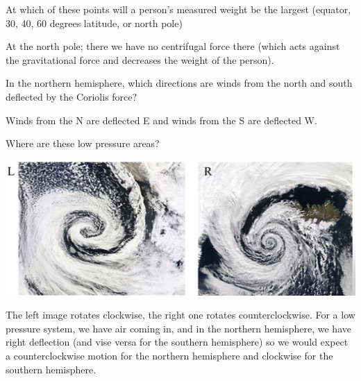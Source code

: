 At which of these points will a person's measured weight be the largest (equator, 30, 40, 60 degrees latitude, or north pole)
\begin{s}
At the north pole; there we have no centrifugal force there (which acts against the gravitational force and decreases the weight of the person). 
\end{s}

In the northern hemisphere, which directions are winds from the north and south deflected by the Coriolis force?
\begin{s}
Winds from the N are deflected E and winds from the S are deflected W.
\end{s}

Where are these low pressure areas?
\begin{center}
    \includegraphics[scale=0.5]{Lecture-16/l16-img2.png}
\end{center}
\begin{s}
The left image rotates clockwise, the right one rotates counterclockwise. For a low pressure system, we have air coming in, and in the northern hemisphere, we have right deflection (and vise versa for the southern hemisphere) so we would expect a counterclockwise motion for the northern hemisphere and clockwise for the southern hemisphere.
\end{s}

